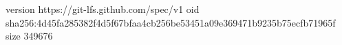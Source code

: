 version https://git-lfs.github.com/spec/v1
oid sha256:4d45fa285382f4d5f67bfaa4cb256be53451a09e369471b9235b75ecfb71965f
size 349676
